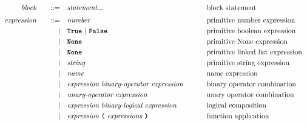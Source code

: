\begin{alignat*}{9}
&& \textit{block}           && \quad ::= \quad & \textit{statement}...\ \quad                                                                                      && \textrm{block statement}                  \\[1mm]
&& \textit{expression}      && \quad ::= \quad & \textit{number}                                                                                                   && \textrm{primitive number expression}      \\
&&                          &&         | \quad & \textbf{\texttt{True}}\ |\ \textbf{\texttt{False}}                                                                && \textrm{primitive boolean expression}     \\
&&                          &&         | \quad & \textbf{\texttt{None}}                                                                                            && \textrm{primitive None expression}        \\
&&                          &&         | \quad & \textbf{\texttt{None}}                                                                                            && \textrm{primitive linked list expression} \\
&&                          &&         | \quad & \textit{string}                                                                                                   && \textrm{primitive string expression}      \\
&&                          &&         | \quad & \textit{name}                                                                                                     && \textrm{name expression}                  \\
&&                          &&         | \quad & \textit{expression}\ \textit{binary-operator}\ \textit{expression}\ \qquad                                        && \textrm{binary operator combination}      \\
&&                          &&         | \quad & \textit{unary-operator}\ \textit{expression}                                                                      && \textrm{unary operator combination}       \\
&&                          &&         | \quad & \textit{expression}\ \textit{binary-logical}\ \textit{expression}\ \qquad                                         && \textrm{logical composition}              \\
&&                          &&         | \quad & \textit{expression}\ \textbf{\texttt{(}}\ \textit{expressions}\ \textbf{\texttt{)}}                               && \textrm{function application}             \\

\end{alignat*}
